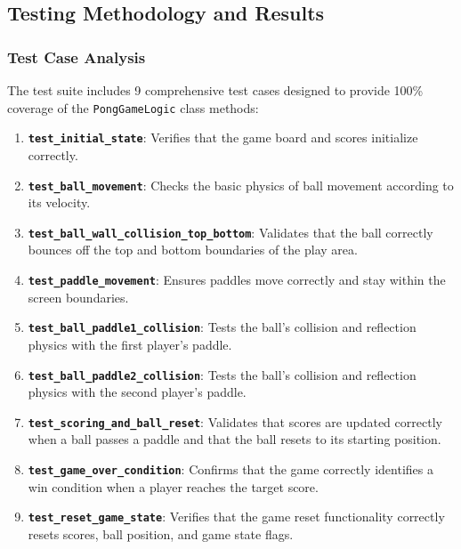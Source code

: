 \documentclass[12pt,a4paper]{article}
\begin{document}
\subsection{Testing Methodology and Results}
\subsubsection{Test Case Analysis}
The test suite includes 9 comprehensive test cases designed to provide 100\% coverage of the \texttt{PongGameLogic} class methods:
\begin{enumerate}
    \item \textbf{\texttt{test\_initial\_state}}: Verifies that the game board and scores initialize correctly.
    \item \textbf{\texttt{test\_ball\_movement}}: Checks the basic physics of ball movement according to its velocity.
    \item \textbf{\texttt{test\_ball\_wall\_collision\_top\_bottom}}: Validates that the ball correctly bounces off the top and bottom boundaries of the play area.
    \item \textbf{\texttt{test\_paddle\_movement}}: Ensures paddles move correctly and stay within the screen boundaries.
    \item \textbf{\texttt{test\_ball\_paddle1\_collision}}: Tests the ball's collision and reflection physics with the first player's paddle.
    \item \textbf{\texttt{test\_ball\_paddle2\_collision}}: Tests the ball's collision and reflection physics with the second player's paddle.
    \item \textbf{\texttt{test\_scoring\_and\_ball\_reset}}: Validates that scores are updated correctly when a ball passes a paddle and that the ball resets to its starting position.
    \item \textbf{\texttt{test\_game\_over\_condition}}: Confirms that the game correctly identifies a win condition when a player reaches the target score.
    \item \textbf{\texttt{test\_reset\_game\_state}}: Verifies that the game reset functionality correctly resets scores, ball position, and game state flags.
\end{enumerate}
\end{document}
